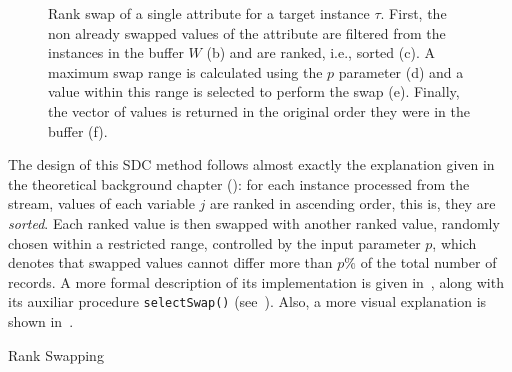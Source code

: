 \begin{figure}
\centering
{}
\caption[Rank swap of an attribute.]{Rank swap of a single attribute for a target instance $\tau$. First, the non already swapped values of the attribute are filtered from the instances in the buffer $W$ (b) and are ranked, i.e., sorted (c). A maximum swap range is calculated using the $p$ parameter (d) and a value within this range is selected to perform the swap (e). Finally, the vector of values is returned in the original order they were in the buffer (f).}
\label{fig:rank-swapping-schematic-2}
\end{figure}

The design of this SDC method follows almost exactly the explanation given in the theoretical background chapter (): for each instance processed from the stream, values of each variable $j$ are ranked in ascending order, this is, they are \textit{sorted}. Each ranked value is then swapped with another ranked value, randomly chosen within a restricted range, controlled by the input parameter $p$, which denotes that swapped values cannot differ more than $p\%$ of the total number of records. A more formal description of its implementation is given in~, along with its auxiliar procedure \texttt{selectSwap()} (see~). Also, a more visual explanation is shown in~.

\begin{algorithm}[H]
\caption{Rank Swapping\label{al:rank-swapping}}
\end{algorithm}

